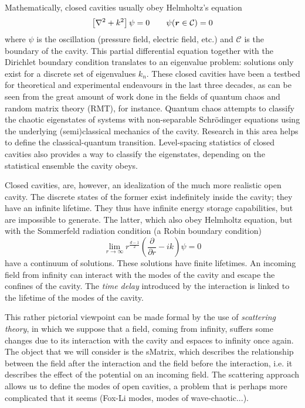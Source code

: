 Mathematically, closed cavities usually obey Helmholtz's equation
  \begin{equation}
   \left[\nabla^2+k^2\right]\psi=0\qquad \psi(\boldsymbol{r}\in\mathcal{C})=0
  \end{equation}
where $\psi$ is the oscillation (pressure field, electric field, etc.)
and $\mathcal{C}$ is the boundary of the cavity. This partial differential
equation together with the Dirichlet boundary condition translates to an
eigenvalue problem: solutions only exist for a discrete set of eigenvalues 
$k_n$. These closed cavities have been a testbed for theoretical
and experimental endeavours in the last three decades, as can be
seen from the great amount of work done in the fields of quantum 
chaos and random matrix theory (RMT), for instance. Quantum chaos attempts
to classify the chaotic eigenstates of systems with non-separable Schrödinger
equations using the underlying (semi)classical mechanics of the 
cavity. Research in this area helps to define the classical-quantum
transition. Level-spacing statistics of closed cavities also provides
a way to classify the eigenstates, depending on the statistical 
ensemble the cavity obeys. 

Closed cavities, are, however, an idealization of the much more
realistic open cavity. The discrete states of the former exist 
indefinitely inside the cavity; they have an infinite lifetime. 
They thus have infinite energy storage capabilities, but are impossible 
to generate. The latter, which also obey Helmholtz equation, but with the 
Sommerfeld radiation condition (a Robin boundary condition)
  \begin{equation}
   \lim_{r\rightarrow\infty}r^{\frac{d-1}{2}}\left(\frac{\partial}{\partial r}-ik\right)\psi=0
  \end{equation}
have a continuum of solutions. These solutions have finite lifetimes.
An incoming field from infinity can interact with the modes of the
cavity and escape the confines of the cavity. The \textit{time delay} introduced
by the interaction is linked to the lifetime of the modes of the cavity. 

This rather pictorial viewpoint can be made formal by the use of \textit{scattering theory}, 
in which we suppose that a field, coming from infinity, suffers some changes due to its
interaction with the cavity and espaces to infinity once again. The object that we will consider
is the \gls{sMatrix}, which describes the relationship between the field after the interaction
and the field before the interaction, i.e. it describes the effect of the potential
on an incoming field. The scattering approach allows us to define the modes of 
open cavities, a problem that is perhaps more complicated that it seems \cite{DUT2000,DUT2001,TUR2005} (Fox-Li modes, modes of
wave-chaotic...). 

